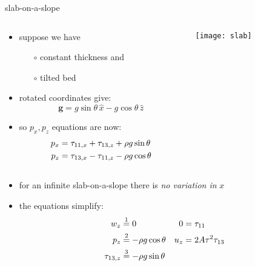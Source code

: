 \begin{frame}{slab-on-a-slope}

\vspace{-0.05in}
\small

\begin{columns}

\begin{column}{0.5\textwidth}
\begin{itemize}
\item suppose we have
  \begin{itemize}
  \item[$\circ$] constant thickness and 
  \item[$\circ$] tilted bed
  \end{itemize}
\item rotated coordinates give:
  $$\mathbf{g} = g \sin\theta\, \hat x - g \cos \theta \,\hat z$$
\item so $p_x,p_z$ equations are now:
\begin{align}
p_x &= \tau_{11,x} + \tau_{13,z} + \rho g \sin\theta \notag \\
p_z &= \tau_{13,x} - \tau_{11,z} - \rho g \cos\theta \notag
\end{align}
\end{itemize}
\end{column}

\begin{column}{0.5\textwidth}
\texttt{[image: slab]}
\end{column}

\end{columns}

\begin{itemize}
\item for an infinite \alert{slab-on-a-slope} there is \emph{no variation in} $x$
\item the equations simplify:
\small
\begin{align}
w_z &\stackrel{1}{=} 0 &   0 &= \tau_{11} \notag \\
p_z &\stackrel{2}{=} - \rho g \cos\theta &   u_z &= 2 A \tau^2 \tau_{13} \notag \\
\tau_{13,z} &\stackrel{3}{=} - \rho g \sin\theta \notag
\end{align}
\normalsize
\end{itemize}
\end{frame}



